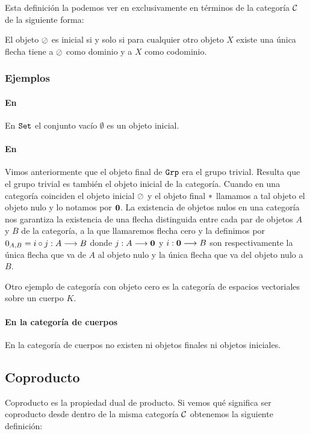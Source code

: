 Esta definición la podemos ver en exclusivamente en términos
de la categoría $\mathcal{C}$ de la siguiente forma:
\begin{proposition}
El objeto $\oslash$ es inicial si y solo si para cualquier otro objeto
$X$ existe una única flecha tiene a $\oslash$ como dominio y a $X$ como
codominio.
\end{proposition}

\subsubsection{Ejemplos}
\paragraph{En \Set}
En $\texttt{Set}$ el conjunto vacío $\emptyset$ es un objeto inicial.

\paragraph{En \Grp}
Vimos anteriormente que el objeto final de $\texttt{Grp}$ era el grupo
trivial. Resulta que el grupo trivial es también el objeto inicial
de la categoría. Cuando en una categoría coinciden el objeto inicial
$\oslash$ y el objeto final $*$ llamamos a tal objeto el objeto
nulo y lo notamos por $\textbf{0}$. La existencia de objetos nulos en una categoría nos garantiza
la existencia de una flecha distinguida entre cada par de objetos
$A$ y $B$ de la categoría, a la que llamaremos
flecha cero y la definimos por
$0_{A,B} = i \circ j : A\longrightarrow B$ donde
$j: A\longrightarrow \textbf{0}$ y $i : \textbf{0}\longrightarrow B$
son respectivamente la única flecha que va de $A$ al objeto nulo y
la única flecha que va del objeto nulo a $B$.


Otro ejemplo de categoría con objeto cero es la categoría de espacios
vectoriales sobre un cuerpo $K$.

\paragraph{En la categoría de cuerpos}
En la categoría de cuerpos no existen ni objetos finales ni objetos
iniciales.

\subsection{Coproducto}
Coproducto es la propiedad dual de producto. Si vemos qué significa
ser coproducto desde dentro de la misma categoría $\mathcal{C}$ obtenemos
la siguiente definición:

